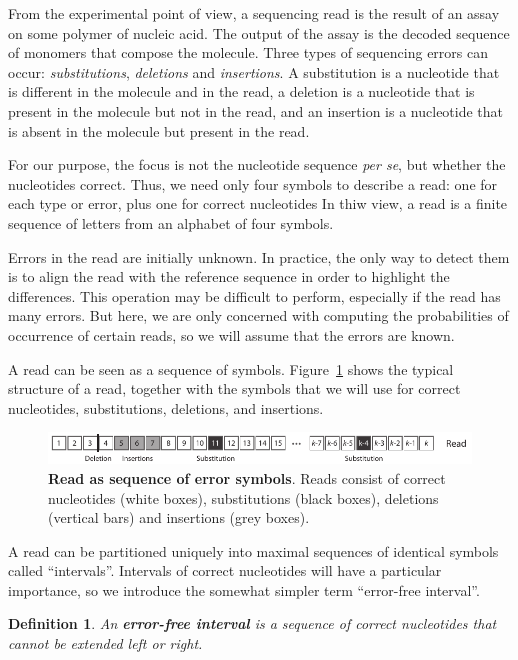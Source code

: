 \documentclass{article}
\newtheorem{definition}{Definition}
\begin{document}
From the experimental point of view, a sequencing read is the result of an
assay on some polymer of nucleic acid. The output of the assay is the
decoded sequence of monomers that compose the molecule. Three types of
sequencing errors can occur: \emph{substitutions}, \emph{deletions} and
\emph{insertions}. A substitution is a nucleotide that is different in the
molecule and in the read, a deletion is a nucleotide that is present in
the molecule but not in the read, and an insertion is a nucleotide that is
absent in the molecule but present in the read.

For our purpose, the focus is not the nucleotide sequence \textit{per se},
but whether the nucleotides correct. Thus, we need only four symbols to
describe a read: one for each type or error, plus one for correct
nucleotides In thiw view, a read is a finite sequence of letters from an
alphabet of four symbols.

Errors in the read are initially unknown. In practice, the only way to
detect them is to align the read with the reference sequence in order to
highlight the differences. This operation may be difficult to perform,
especially if the read has many errors. But here, we are only concerned
with computing the probabilities of occurrence of certain reads, so we
will assume that the errors are known. 

A read can be seen as a sequence of symbols. Figure~\ref{fig:sketchseed}
shows the typical structure of a read, together with the symbols that we
will use for correct nucleotides, substitutions, deletions, and
insertions.

\begin{figure}[h]
\centering
\includegraphics[scale=0.88]{sketch_seeding.pdf}
\caption{\textbf{Read as sequence of error symbols}. Reads consist of
correct nucleotides (white boxes), substitutions (black boxes), deletions
(vertical bars) and insertions (grey boxes).}
\label{fig:sketchseed}
\end{figure}

A read can be partitioned uniquely into maximal sequences of identical
symbols called ``intervals''. Intervals of correct nucleotides will have a
particular importance, so we introduce the somewhat simpler term
``error-free interval''.

\begin{definition}
\label{def:error-free-interval}
An \textbf{error-free interval} is a sequence of correct nucleotides that
cannot be extended left or right.
\end{definition}
\end{document}
